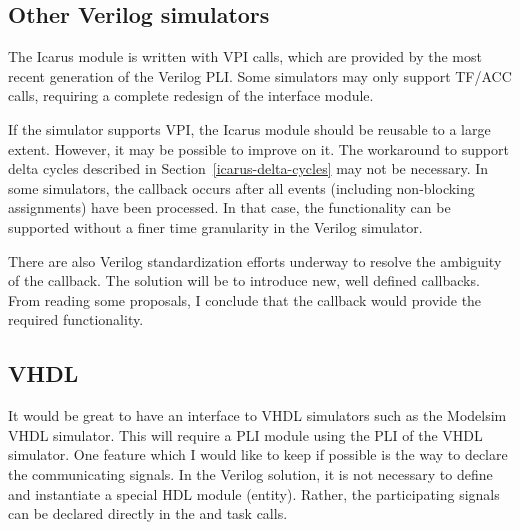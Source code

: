 \subsection{Other Verilog simulators}

The Icarus module is written with VPI calls, which are provided by the
most recent generation of the Verilog PLI. Some simulators may only
support TF/ACC calls, requiring a complete redesign of the interface
module.

If the simulator supports VPI, the Icarus module should be reusable to
a large extent. However, it may be possible to improve on it.  The
workaround to support delta cycles described in
Section~\ref{icarus-delta-cycles} may not be necessary. In some
simulators, the  callback occurs after all
events (including non-blocking assignments) have been processed. In
that case, the functionality can be supported without a finer time
granularity in the Verilog simulator.

There are also Verilog standardization efforts underway to resolve the
ambiguity of the  callback. The solution will be
to introduce new, well defined callbacks. From reading some proposals,
I conclude that the  callback would provide the
required functionality.

\subsection{VHDL}

It would be great to have an interface to VHDL simulators such as the
Modelsim VHDL simulator. This will require a PLI module using the
PLI of the VHDL simulator. One feature which I would
like to keep if possible is the way to declare the communicating
signals.  In the Verilog solution, it is not necessary to define and
instantiate a special HDL module (entity). Rather, the participating
signals can be declared directly in the  and
 task calls.
